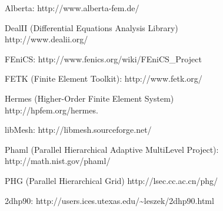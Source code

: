 \begin{thebibliography}{[codes]}

Alberta: http://www.alberta-fem.de/

DealII (Differential Equations Analysis Library) \\ http://www.dealii.org/

FEniCS: http://www.fenics.org/wiki/FEniCS\_Project

FETK (Finite Element Toolkit): http://www.fetk.org/

Hermes (Higher-Order Finite Element System) \\ http://hpfem.org/hermes.

libMesh: http://libmesh.sourceforge.net/

Phaml (Parallel Hierarchical Adaptive MultiLevel Project): \\ http://math.nist.gov/phaml/

PHG (Parallel Hierarchical Grid) http://lsec.cc.ac.cn/phg/

2dhp90: http://users.ices.utexas.edu/\~{}leszek/2dhp90.html

\end{thebibliography}
